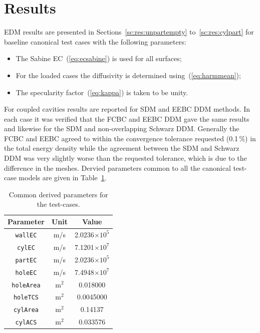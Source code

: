 \documentclass[a4paper]{article}
\numberwithin{equation}{section}
\newcounter{Table}
\begin{document}
\section[Results]{Results}
\label{sc:res}

EDM results are presented in Sections~\ref{sc:res:unpartempty} to~\ref{sc:res:cylpart} for baseline canonical 
test cases with the following parameters:
\begin{itemize}
 \item The Sabine EC~(\ref{eq:ecsabine}) is used for all surfaces;
 \item For the loaded cases the diffusivity is determined using~(\ref{eq:harmmean});
 \item The specularity factor~(\ref{eq:kappa}) is taken to be unity.
\end{itemize}
For coupled cavities results are reported for SDM and EEBC DDM methods. In each case it was verified
that the FCBC and EEBC DDM gave the same results and likewise for the SDM and non-overlapping Schwarz
DDM. Generally the FCBC and EEBC agreed to within the convergence tolerance requested (0.1\,\%) in the 
total energy density while the agreement between the SDM and Schwarz DDM was very slightly worse than
the requested tolerance, which is due to the difference in the meshes. Dervied parameters common 
to all the canonical test-case models are given in Table~\ref{tb:derivparams}.

\begin{table}[ht]
\begin{center}
\begin{tabular}{|c|c|c|}
\hline
\textbf{Parameter}     &\textbf{Unit} &\textbf{Value}\\ 
\hline
\texttt{wallEC}        &m/s           &2.0236$\times 10^5$ \\
\texttt{cylEC}         &m/s           &7.1201$\times 10^7$ \\
\texttt{partEC}        &m/s           &2.0236$\times 10^5$ \\
\texttt{holeEC}        &m/s           &7.4948$\times 10^7$ \\
\texttt{holeArea}      &m$^2$         &0.018000            \\
\texttt{holeTCS}       &m$^2$         &0.0045000           \\
\texttt{cylArea}       &m$^2$         &0.14137             \\
\texttt{cylACS}        &m$^2$         &0.033576            \\
\hline
\end{tabular}
\end{center}
\caption{\label{tb:derivparams} Common derived parameters for the test-cases.}
\end{table}
\end{document}
